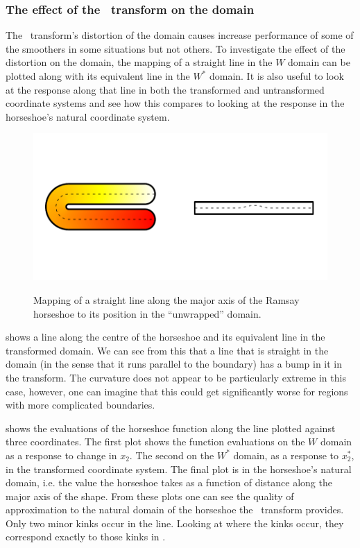 \subsubsection{The effect of the \sch\ transform on the domain}

The \sch\ transform's distortion of the domain causes increase performance of some of the smoothers in some situations but not others. To investigate the effect of the distortion on the domain, the mapping of a straight line in the $W$ domain can be plotted along with its equivalent line in the $W^*$ domain. It is also useful to look at the response along that line in both the transformed and untransformed coordinate systems and see how this compares to looking at the response in the horseshoe's natural coordinate system.

\begin{figure}
\centering
\includegraphics[trim=0.5in 1in 0in 1in]{sc/figs/horseshoecentreline.pdf} \\
\caption{Mapping of a straight line along the major axis of the Ramsay horseshoe to its position in the ``unwrapped'' domain.}
\label{horseshoecentreline}
\end{figure}

 shows a line along the centre of the horseshoe and its equivalent line in the transformed domain. We can see from this that a line that is straight in the domain (in the sense that it runs parallel to the boundary) has a bump in it in the transform. The curvature does not appear to be particularly extreme in this case, however, one can imagine that this could get significantly worse for regions with more complicated boundaries.

 shows the evaluations of the horseshoe function along the line plotted against three coordinates. The first plot shows the function evaluations on the $W$ domain as a response to change in $x_2$. The second on the $W^*$ domain, as a response to $x_2^*$, in the transformed coordinate system. The final plot is in the horseshoe's natural domain, i.e. the value the horseshoe takes as a function of distance along the major axis of the shape. From these plots one can see the quality of approximation to the natural domain of the horseshoe the \sch\ transform provides. Only two minor kinks occur in the line. Looking at where the kinks occur, they correspond exactly to those kinks in . 

